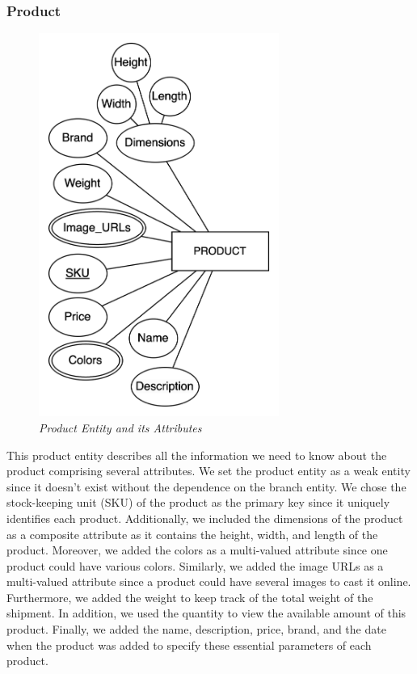 \documentclass[11pt]{article}
\begin{document}
\subsubsection{Product}
\begin{figure}[H]
  \centering
  \includegraphics[width=0.7\textwidth]{images/entities/product.png}
  \caption{\textit{Product Entity and its Attributes}}
\end{figure}

This product entity describes all the information we need to know about the product comprising several attributes. We set the product entity as a weak entity since it doesn't exist without the dependence on the branch entity. We chose the stock-keeping unit (SKU) of the product as the primary key since it uniquely identifies each product. Additionally, we included the dimensions of the product as a composite attribute as it contains the height, width, and length of the product. Moreover, we added the colors as a multi-valued attribute since one product could have various colors. Similarly, we added the image URLs as a multi-valued attribute since a product could have several images to cast it online. Furthermore, we added the weight to keep track of the total weight of the shipment. In addition, we used the quantity to view the available amount of this product. Finally, we added the name, description, price, brand, and the date when the product was added to specify these essential parameters of each product.
\end{document}
